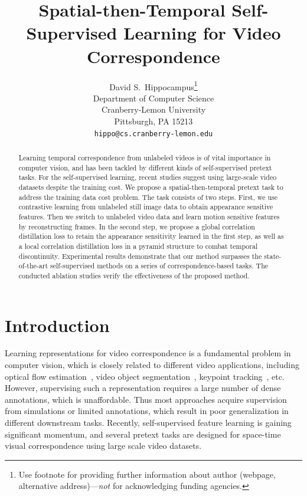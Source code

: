 \documentclass{article}
\title{Spatial-then-Temporal Self-Supervised Learning for Video Correspondence}
\author{%
  David S.~Hippocampus\thanks{Use footnote for providing further information
    about author (webpage, alternative address)---\emph{not} for acknowledging
    funding agencies.} \\
  Department of Computer Science\\
  Cranberry-Lemon University\\
  Pittsburgh, PA 15213 \\
  \texttt{hippo@cs.cranberry-lemon.edu} \\
}
\begin{document}
\maketitle


\begin{abstract}
  Learning temporal correspondence from unlabeled videos is of vital importance in computer vision, and has been tackled by different kinds of self-supervised pretext tasks. For the self-supervised learning, recent studies suggest using large-scale video datasets despite the training cost. We propose a spatial-then-temporal pretext task to address the training data cost problem. The task consists of two steps. First, we use contrastive learning from unlabeled still image data to obtain appearance sensitive features. Then we switch to unlabeled video data and learn motion sensitive features by reconstructing frames. In the second step, we propose a global correlation distillation loss to retain the appearance sensitivity learned in the first step, as well as a local correlation distillation loss in a pyramid structure to combat temporal discontinuity. Experimental results demonstrate that our method surpasses the state-of-the-art self-supervised methods on a series of correspondence-based tasks. The conducted ablation studies verify the effectiveness of the proposed method.
\end{abstract}



\section{Introduction}
Learning representations for video correspondence is a fundamental problem in computer vision, which is closely related to different video applications, including optical flow estimation~\cite{dosovitskiy2015flownet}\cite{horn1981determining}, video object segmentation~\cite{caelles2017one}\cite{oh2019video}, keypoint tracking~\cite{xiu2018pose}, etc. However, supervising such a representation requires a large number of dense annotations, which is unaffordable. Thus most approaches acquire supervision from simulations or limited annotations, which result in poor generalization in different downstream tasks. Recently, self-supervised feature learning is gaining significant momentum, and several pretext tasks are designed for space-time visual correspondence using large scale video datasets.
\end{document}
